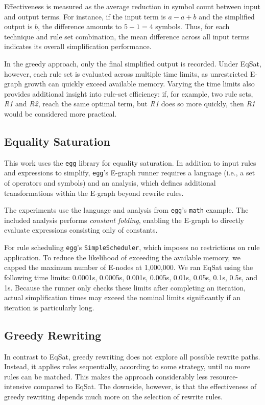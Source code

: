 Effectiveness is measured as the average reduction in symbol count between input and output terms. For instance, if the input term is $a - a + b$ and the simplified output is $b$, the difference amounts to $5 - 1 = 4$ symbols. Thus, for each technique and rule set combination, the mean difference across all input terms indicates its overall simplification performance.

In the greedy approach, only the final simplified output is recorded. Under EqSat, however, each rule set is evaluated across multiple time limits, as unrestricted E-graph growth can quickly exceed available memory. Varying the time limits also provides additional insight into rule-set efficiency: if, for example, two rule sets, \emph{R1} and \emph{R2}, reach the same optimal term, but \emph{R1} does so more quickly, then \emph{R1} would be considered more practical.

\subsection{Equality Saturation}
\label{sec:eqsat}
This work uses the \texttt{egg} library for equality saturation. In addition to input rules and expressions to simplify, \texttt{egg}'s E-graph runner requires a language (i.e., a set of operators and symbols) and an analysis, which defines additional transformations within the E-graph beyond rewrite rules.

The experiments use the language and analysis from \texttt{egg}'s \texttt{math} example. The included analysis performs \emph{constant folding}, enabling the E-graph to directly evaluate expressions consisting only of constants. 

For rule scheduling \texttt{egg}'s \texttt{SimpleScheduler}, which imposes no restrictions on rule application. To reduce the likelihood of exceeding the available memory, we capped the maximum number of E-nodes at 1,000,000. We ran EqSat using the following time limits: 0.0001s, 0.0005s, 0.001s, 0.005s, 0.01s, 0.05s, 0.1s, 0.5s, and 1s. Because the runner only checks these limits after completing an iteration, actual simplification times may exceed the nominal limits significantly if an iteration is particularly long.

\subsection{Greedy Rewriting}
\label{sec:greedy}
In contrast to EqSat, greedy rewriting does not explore all possible rewrite paths. Instead, it applies rules sequentially, according to some strategy, until no more rules can be matched. This makes the approach considerably less resource-intensive compared to EqSat. The downside, however, is that the effectiveness of greedy rewriting depends much more on the selection of rewrite rules. 

